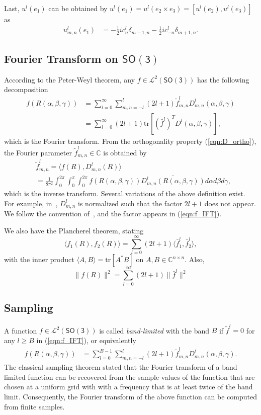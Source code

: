 \documentclass[onecolumn,11pt]{IEEEtran}
\newcommand{\pair}[1]{\ensuremath{\langle #1 \rangle}}
\newcommand{\refeqn}[1]{(\ref{eqn:#1})}
\newcommand{\trs}[1]{\mathrm{tr}\ensuremath{[#1]}}
\newcommand{\SO}{\ensuremath{\mathsf{SO(3)}}}
\newcommand{\Cp}{\ensuremath{\mathbb{C}}}
\begin{document}
Last, $u^l(e_1)$ can be obtained by $u^l(e_1)=u^l(e_2\times e_3)=[u^l(e_2), u^l(e_3)]$ as
\begin{align}
u^l_{m,n}(e_1) 
& = -\frac{1}{2}i c^l_n \delta_{m-1,n}-\frac{1}{2}i c^l_{-n} \delta_{m+1,n}.
\end{align}

\subsection{Fourier Transform on $\SO$}

According to the Peter-Weyl theorem, any $f\in\mathcal{L}^2(\SO)$ has the following decomposition
\begin{align}
f(R(\alpha,\beta,\gamma)) &= \sum_{l=0}^\infty \sum_{m,n=-l}^l (2l+1)\tilde f^l_{m,n} D^l_{m,n}(\alpha,\beta,\gamma)\nonumber\\
&= \sum_{l=0}^\infty (2l+1)\trs{(\bar f^l)^T D^l(\alpha,\beta,\gamma)},\label{eqn:f_IFT}
\end{align}
which is the Fourier transform. 
From the orthogonality property \refeqn{D_ortho}, the Fourier parameter $\tilde f^l_{m,n}\in\Cp$ is obtained by
\begin{align}
& \tilde f^l_{m,n}=\pair{ f(R), D^l_{m,n}(R)}\nonumber\\
& =\frac{1}{8\pi^2}\int_0^{2\pi}\int_{0}^\pi\int_0^{2\pi} f(R(\alpha,\beta,\gamma)) \overline{D^{l}_{m,n}(R(\alpha,\beta,\gamma))}d\alpha d\beta d\gamma,\label{eqn:f_FT}
\end{align}
which is the inverse transform. 
Several variations of the above definition exist. 
For example, in~\cite{KosRocJFAA08}, $D^l_{m,n}$ is normalized such that the factor $2l+1$ does not appear. 
We follow the convention of~\cite{ChiKya01}, and the factor appears in \refeqn{f_IFT}.

We also have the Plancherel theorem, stating
\[
\pair{f_1(R), f_2(R)} = \sum_{l=0}^\infty (2l+1)\pair{\bar f_1^l, \bar f_2^l},
\]
with the inner product $\pair{A,B}=\trs{A^*B}$ on $A,B\in\Cp^{n\times n}$. Also, 
\[
\| f(R)\|^2 = \sum_{l=0}^\infty (2l+1)\|\bar f^l\|^2
\]


\subsection{Sampling}

A function $f\in\mathcal{L}^2(\SO)$ is called \textit{band-limited} with the band $B$ if $\tilde f^l=0$ for any $l\geq B$ in \refeqn{f_IFT}, or equivalently
\begin{align}
f(R(\alpha,\beta,\gamma)) &= \sum_{l=0}^{B-1} \sum_{m,n=-l}^l (2l+1)\tilde f^l_{m,n} D^l_{m,n}(\alpha,\beta,\gamma).\label{eqn:fB}
\end{align}
The classical sampling theorem stated that the Fourier transform of a band limited function can be recovered from the sample values of the function that are chosen at a uniform grid with with a frequency that is at least twice of the band limit. 
Consequently, the Fourier transform of the above function can be computed from finite samples. 
\end{document}
